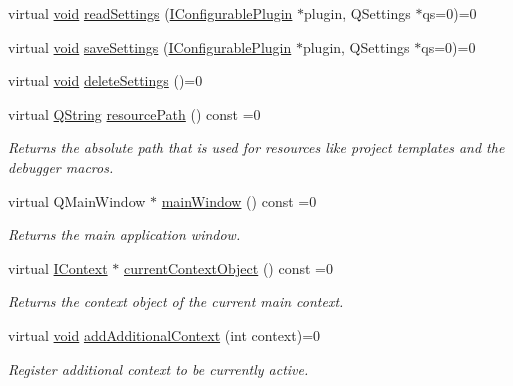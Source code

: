 \begin{DoxyCompactItemize}
\item 
virtual \hyperlink{group___u_a_v_objects_plugin_ga444cf2ff3f0ecbe028adce838d373f5c}{void} \hyperlink{group___core_plugin_gaba11ef90a574d6fc43e5fefa77f747f5}{read\-Settings} (\hyperlink{class_core_1_1_i_configurable_plugin}{\-I\-Configurable\-Plugin} $\ast$plugin, \-Q\-Settings $\ast$qs=0)=0
\item 
virtual \hyperlink{group___u_a_v_objects_plugin_ga444cf2ff3f0ecbe028adce838d373f5c}{void} \hyperlink{group___core_plugin_ga1ac91d45ba8e5a39f9e2da76a12a04a6}{save\-Settings} (\hyperlink{class_core_1_1_i_configurable_plugin}{\-I\-Configurable\-Plugin} $\ast$plugin, \-Q\-Settings $\ast$qs=0)=0
\item 
virtual \hyperlink{group___u_a_v_objects_plugin_ga444cf2ff3f0ecbe028adce838d373f5c}{void} \hyperlink{group___core_plugin_ga2dc9f1b6c02a1af850ca62d9c617f653}{delete\-Settings} ()=0
\item 
virtual \hyperlink{group___u_a_v_objects_plugin_gab9d252f49c333c94a72f97ce3105a32d}{\-Q\-String} \hyperlink{group___core_plugin_ga1e0dca9dfe2fad0bd3b2d80ce2430f6d}{resource\-Path} () const =0
\begin{DoxyCompactList}\small\item\em \-Returns the absolute path that is used for resources like project templates and the debugger macros. \end{DoxyCompactList}\item 
virtual \-Q\-Main\-Window $\ast$ \hyperlink{group___core_plugin_ga7bd137564271d03a3db75c0c71b99ea8}{main\-Window} () const =0
\begin{DoxyCompactList}\small\item\em \-Returns the main application window. \end{DoxyCompactList}\item 
virtual \hyperlink{class_core_1_1_i_context}{\-I\-Context} $\ast$ \hyperlink{group___core_plugin_gad6967a507c1b0d7750a8380fc066ca6c}{current\-Context\-Object} () const =0
\begin{DoxyCompactList}\small\item\em \-Returns the context object of the current main context. \end{DoxyCompactList}\item 
virtual \hyperlink{group___u_a_v_objects_plugin_ga444cf2ff3f0ecbe028adce838d373f5c}{void} \hyperlink{group___core_plugin_gac04a98dd5b83cefd448fa47b5f5c9bea}{add\-Additional\-Context} (int context)=0
\begin{DoxyCompactList}\small\item\em \-Register additional context to be currently active. \end{DoxyCompactList}\item 

\end{DoxyCompactItemize}
